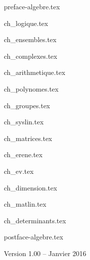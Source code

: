 \documentclass[11pt,twoside,openright]{report}
\begin{document}
\renewcommand{\contentsname}{Sommaire}

{preface-algebre.tex}

\debutchapitres



{ch_logique.tex}
 
{ch_ensembles.tex}

{ch_complexes.tex}

{ch_arithmetique.tex}

{ch_polynomes.tex}

{ch_groupes.tex}


{ch_syslin.tex}

{ch_matrices.tex}

{ch_erene.tex}
 
{ch_ev.tex}
 
{ch_dimension.tex}
  
{ch_matlin.tex}
 
{ch_determinants.tex}


{postface-algebre.tex}

\vfill

\centerline{Version 1.00 -- Janvier 2016}
\end{document}

